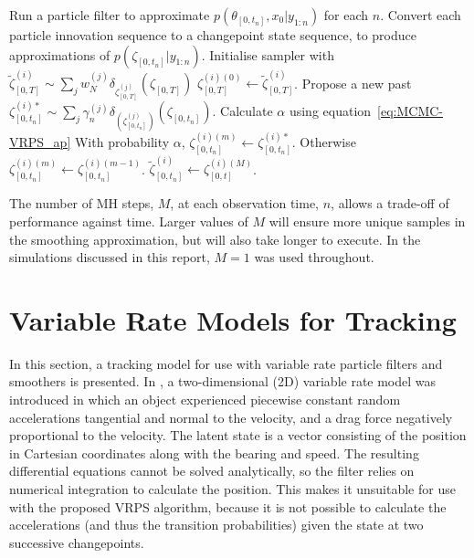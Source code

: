 \documentclass[journal]{IEEEtran}
\begin{document}
 \begin{algorithmic}
  \STATE Run a particle filter to approximate $p(\theta_{[0,t_n]}, x_0|y_{1:n})$ for each $n$.
  \STATE Convert each particle innovation sequence to a changepoint state sequence, to produce approximations of $p(\zeta_{[0,t_n]}|y_{1:n})$.
    \STATE Initialise sampler with $\tilde{\zeta}_{[0,T]}^{(i)} \sim \sum_{j} w_N^{(j)} \delta_{\zeta_{[0,T]}^{(j)}}(\zeta_{[0,T]})$
      \STATE $\zeta_{[0,T]}^{(i)(0)} \gets \tilde{\zeta}_{[0,T]}^{(i)}$.
        \STATE Propose a new past $\zeta_{[0,t_n]}^{(i)*} \sim \sum_j \gamma_n^{(j)} \delta_{(\zeta_{[0,t_n]}^{(j)})}(\zeta_{[0,t_n]})$.
	      \STATE Calculate $\alpha$ using equation~\ref{eq:MCMC-VRPS_ap}
	      \STATE With probability $\alpha$, $\zeta_{[0,t_n]}^{(i)(m)} \gets \zeta_{[0,t_n]}^{(i)*}$. Otherwise $\zeta_{[0,t_n]}^{(i)(m)} \gets \zeta_{[0,t_n]}^{(i)(m-1)}$.
      \ENDFOR
      \STATE $\tilde{\zeta}_{[0,t_n]}^{(i)} \gets \zeta_{[0,t]}^{(i)(M)}$.
    \ENDFOR
  \ENDFOR
 \end{algorithmic}

The number of MH steps, $M$, at each observation time, $n$, allows a trade-off of performance against time. Larger values of $M$ will ensure more unique samples in the smoothing approximation, but will also take longer to execute. In the simulations discussed in this report, $M=1$ was used throughout.



\section{Variable Rate Models for Tracking}

In this section, a tracking model for use with variable rate particle filters and smoothers is presented. In \cite{Godsill2007,Godsill2007a}, a two-dimensional (2D) variable rate model was introduced in which an object experienced piecewise constant random accelerations tangential and normal to the velocity, and a drag force negatively proportional to the velocity. The latent state is a vector consisting of the position in Cartesian coordinates along with the bearing and speed. The resulting differential equations cannot be solved analytically, so the filter relies on numerical integration to calculate the position. This makes it unsuitable for use with the proposed VRPS algorithm, because it is not possible to calculate the accelerations (and thus the transition probabilities) given the state at two successive changepoints.
\end{document}
